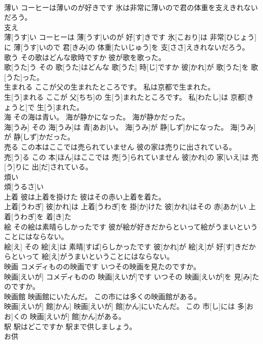 \documentclass[8pt]{extreport}
\begin{document}
\begin{CJK}{UTF8}{min}
\\	薄い コーヒーは薄いのが好きです 氷は非常に薄いので君の体重を支えきれないだろう。	
\\	支え 
\\	薄[うす]い コーヒーは 薄[うす]いのが 好[す]きです 氷[こおり]は 非常[ひじょう]に 薄[うす]いので 君[きみ]の 体重[たいじゅう]を 支[ささ]えきれないだろう。
\\	歌う その歌はどんな歌時ですか 彼が歌を歌った。	
\\	歌[うた]う その 歌[うた]はどんな 歌[うた] 時[じ]ですか 彼[かれ]が 歌[うた]を 歌[うた]った。
\\	生まれる ここが父の生まれたところです。 私は京都で生まれた。	
\\	生[う]まれる ここが 父[ちち]の 生[う]まれたところです。 私[わたし]は 京都[きょうと]で 生[う]まれた。
\\	海 その海は青い。 海が静かになった。 海が静かだった。	
\\	海[うみ] その 海[うみ]は 青[あお]い。 海[うみ]が 静[しず]かになった。 海[うみ]が 静[しず]かだった。
\\	売る この本はここでは売られていません 彼の家は売りに出されている。	
\\	売[う]る この 本[ほん]はここでは 売[う]られていません 彼[かれ]の 家[いえ]は 売[う]りに 出[だ]されている。
\\	煩い	
\\	煩[うるさ]い
\\	上着 彼は上着を掛けた 彼はその赤い上着を着た。	
\\	上着[うわぎ] 彼[かれ]は 上着[うわぎ]を 掛[か]けた 彼[かれ]はその 赤[あか]い 上着[うわぎ]を 着[き]た
\\	絵 その絵は素晴らしかったです 彼が絵が好きだからといって絵がうまいということにはならない。	
\\	絵[え] その 絵[え]は 素晴[すば]らしかったです 彼[かれ]が 絵[え]が 好[す]きだからといって 絵[え]がうまいということにはならない。
\\	映画 コメディものの映画です いつその映画を見たのですか。	
\\	映画[えいが] コメディものの 映画[えいが]です いつその 映画[えいが]を 見[み]たのですか。
\\	映画館 映画館にいたんだ。 この市には多くの映画館がある。	
\\	映画[えいが] 館[かん] 映画[えいが] 館[かん]にいたんだ。 この 市[し]には 多[おお]くの 映画[えいが] 館[かん]がある。
\\	駅 駅はどこですか 駅まで供しましょう。	
\\	お供　

\end{CJK}
\end{document}
